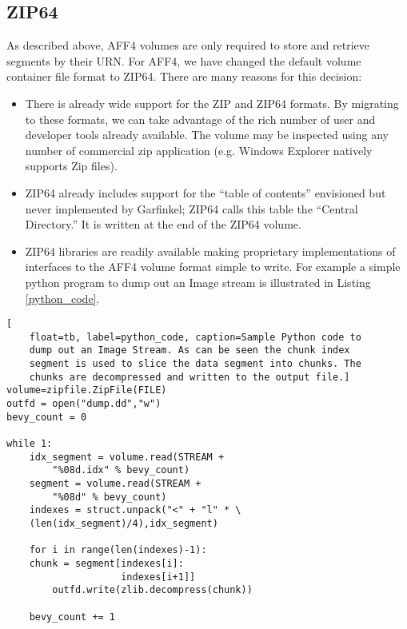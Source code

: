 \documentclass[10pt, conference]{IEEEtran}
\begin{document}
\subsection{ZIP64}
As described above, AFF4 volumes are only required to store and
retrieve segments by their URN. For AFF4, we have changed the default
volume container file format to ZIP64\cite{zipspecs}. There are many
reasons for this decision:

\begin{itemize}
\item There is already wide support for the ZIP and ZIP64 formats. By
  migrating to these formats, we can take advantage of the rich number
  of user and developer tools already available. The volume may be
inspected using any number of commercial zip application (e.g. Windows
Explorer natively supports Zip files).
 

\item ZIP64 already includes support for the ``table of contents''
  envisioned but never implemented by Garfinkel; ZIP64 calls this
  table the ``Central Directory.'' It is written at the end of the
  ZIP64 volume.

\item ZIP64 libraries are readily available making proprietary implementations of
interfaces to the AFF4 volume format simple to write. For example a
simple python program to dump out an Image stream is illustrated in
Listing \ref{python_code}.

\end{itemize}

\begin{lstlisting}[
	float=tb, label=python_code, caption=Sample Python code to
	dump out an Image Stream. As can be seen the chunk index
	segment is used to slice the data segment into chunks. The
	chunks are decompressed and written to the output file.]
volume=zipfile.ZipFile(FILE)
outfd = open("dump.dd","w")
bevy_count = 0

while 1:
    idx_segment = volume.read(STREAM + 
		"%08d.idx" % bevy_count)
    segment = volume.read(STREAM + 
		"%08d" % bevy_count)
    indexes = struct.unpack("<" + "l" * \
	(len(idx_segment)/4),idx_segment)

    for i in range(len(indexes)-1):
	chunk = segment[indexes[i]:
	                indexes[i+1]]
        outfd.write(zlib.decompress(chunk))

    bevy_count += 1
\end{lstlisting}
\end{document}
